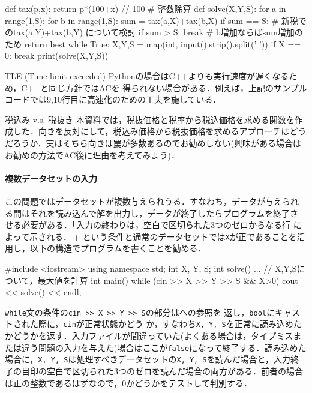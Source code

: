 \begin{pybox}[emph={break}]
def tax(p,x):
    return p*(100+x) // 100     # 整数除算
def solve(X,Y,S):
    for a in range(1,S):
        for b in range(1,S):
            sum = tax(a,X)+tax(b,X)
            if sum == S:
                # 新税でのtax(a,Y)+tax(b,Y) について検討
            if sum > S:
                break           # b増加ならばsum増加のため
    return best
while True:
    X,Y,S = map(int, input().strip().split(' '))
    if X == 0:
        break
    print(solve(X,Y,S))
\end{pybox}

\begin{debugbox}{TLE (Time limit exceeded)}
  Pythonの場合はC++よりも実行速度が遅くなるため，C++と同じ方針ではACを
  得られない場合がある．例えば，上記のサンプルコードでは9,10行目に高速化のための工夫を施している．
\end{debugbox}

\begin{warningbox}{税込み v.s. 税抜き}
  本資料では，税抜価格と税率から税込価格を求める関数を作成した．向きを反対にして，税込み価格から税抜価格を求めるアプローチはどうだろうか．実はそちら向きは罠が多数あるのでお勧めしない(興味がある場合はお勧めの方法でAC後に理由を考えてみよう)．
\end{warningbox}

\paragraph{複数データセットの入力}
この問題ではデータセットが複数与えられうる．すなわち，データが与えられ
る間はそれを読み込んで解を出力し，データが終了したらプログラムを終了さ
せる必要がある．「入力の終わりは，空白で区切られた3つのゼロからなる行
によって示される． 」という条件と通常のデータセットでは\texttt{X}が正であることを活用し，以下の構造でプログラムを書くことを勧める．

\begin{cbox}
#include <iostream>
using namespace std;
int X, Y, S;
int solve() {
  ... // X,Y,Sについて，最大値を計算
}
int main() {
    while (cin >> X >> Y >> S && X>0) {
	cout << solve() << endl;
    }
}  
\end{cbox}

\texttt{while}文の条件の\texttt{cin >> X >> Y >> S}の部分はへの参照を
返し，\texttt{bool}にキャストされた際に，\texttt{cin}が正常状態かどう
か，すなわち\texttt{X, Y, S}を正常に読み込めたかどうかを返す．入力ファイルが間違っていた(よくある場合は，タイプミスまたは違う問題の入力を与えた)場合はここが\texttt{false}になって終了する．読み込めた場合に，\texttt{X, Y, S}は処理すべきデータセットの\texttt{X, Y, S}を読んだ場合と，入力終了の目印の空白で区切られた3つのゼロを読んだ場合の両方がある．前者の場合は正の整数であるはずなので，0かどうかをテストして判別する．

